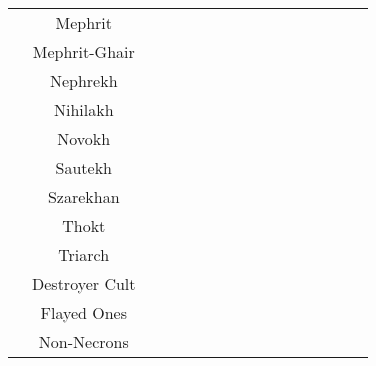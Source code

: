 \begin{tabular}{||c c c c c c c c c c c c c c c c||}
	& Mephrit & \blackskull & \blackskull & & \redskull & \greyskull & \greyskull  & \blackskull & \blackskull & \yellowskull & \blackskull & \blackskull & \greyskull & \redskull & \redskull \\
	& Mephrit-Ghair& \blackskull  & \blackskull & \redskull & & \blackskull & \greyskull & \blackskull & \blackskull & \blackskull & \blackskull & \greyskull & \greyskull & \redskull & \redskull \\
	& Nephrekh & \blackskull & \greyskull & \greyskull & \blackskull & & \blackskull & \blackskull & \blackskull & \blackskull & \blackskull & \blackskull & \greyskull & \redskull & \redskull \\
	& Nihilakh & \blackskull & \greyskull & \greyskull & \greyskull & \blackskull & & \blackskull & \blackskull & \yellowskull & \blackskull & \blackskull & \greyskull & \redskull & \redskull \\
	& Novokh & \blackskull & \blackskull & \blackskull & \blackskull & \blackskull & \blackskull & & \blackskull & \blackskull & \blackskull & \yellowskull & \yellowskull & \redskull & \redskull \\
	& Sautekh & \blackskull & \greyskull & \blackskull & \blackskull & \blackskull & \blackskull & \blackskull & & \redskull & \greyskull & \greyskull & \greyskull & \redskull & \redskull \\
	& Szarekhan & \redskull & \blackskull & \yellowskull & \blackskull & \blackskull & \yellowskull & \blackskull & \redskull & & \yellowskull & \yellowskull & \greyskull & \redskull & \redskull \\
	& Thokt & \blackskull & \greyskull & \blackskull & \blackskull & \blackskull & \blackskull & \blackskull & \greyskull & \yellowskull & & \yellowskull & \greyskull & \redskull & \redskull \\
	& Triarch & \blackskull & \blackskull & \blackskull & \greyskull & \blackskull & \yellowskull & \blackskull & \greyskull & \yellowskull & \yellowskull & & \greyskull & \redskull & \redskull \\
	& Destroyer Cult & \greyskull & \blackskull & \greyskull & \greyskull & \greyskull & \greyskull & \yellowskull & \greyskull & \greyskull & \greyskull & \greyskull & & \greyskull & \redskull \\
	& Flayed Ones & \redskull & \greyskull & \redskull & \redskull & \redskull & \redskull & \redskull & \redskull & \redskull & \redskull & \redskull & \greyskull & & \redskull \\
	& Non-Necrons & \redskull & \redskull & \redskull & \redskull & \redskull & \redskull & \redskull & \redskull & \redskull & \redskull & \redskull & \redskull & \redskull & \\
	\hline
\end{tabular}

